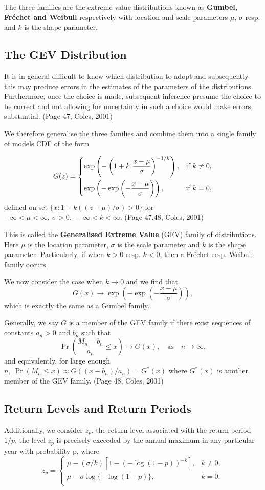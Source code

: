 \documentclass{article}
\begin{document}
The three families are the extreme value distributions known as \textbf{Gumbel, Fr\'{e}chet and Weibull} respectively with location and scale parameters $\mu$, $\sigma$ resp. and $k$ is the shape parameter.

\subsection{The GEV Distribution}
It is in general difficult to know which distribution to adopt and subsequently this may produce errors in the estimates of the parameters of the distributions. Furthermore, once the choice is made, subsequent inference presume the choice to be correct and not allowing for uncertainty in such a choice would make errors substantial. (Page 47, Coles, 2001)

We therefore generalise the three families and combine them into a single family of models CDF of the form

\begin{equation}
G(z)=
\begin{dcases}
\exp\left(-\left(1+k\ \frac{x-\mu}{\sigma}\right)^{-1/k}\right), & \text{if } k \neq 0,\\
\exp\left(-\exp\left(-\frac{x-\mu}{\sigma}\right)\right), & \text{if } k = 0,\label{maingev}
\end{dcases}
\end{equation}
defined on set $\{x:1+k((z-\mu)/\sigma) > 0\}$ for $-\infty < \mu < \infty,\ \sigma > 0,\  -\infty < k < \infty$. (Page 47,48, Coles, 2001)

This is called the \textbf{Generalised Extreme Value} (GEV) family of distributions. Here $\mu$ is the location parameter, $\sigma$ is the scale parameter and $k$ is the shape parameter. Particularly, if when $k>0$ resp. $k<0$, then a Fr\'echet resp. Weibull family occurs.

We now consider the case when $k \to 0$ and we find that 
$$G(x) \to \exp\left(-\exp\left(-\frac{x-\mu}{\sigma}\right)\right),$$ 
which is exactly the same as a Gumbel family.

Generally, we say $G$ is a member of the GEV family if there exist sequences of constants $a_n>0$ and $b_n$ such that 
$$\Pr\left(\frac{{M_n}-{b_n}}{a_n} \leqslant x\right) \to G(x), \quad \text{as} \quad n\to \infty,$$
and equivalently, for large enough $n, \ \Pr(M_n \leqslant x) \approx G((x-b_n)/a_n)=G^{*}(x)$ where $G^{*}(x)$ is another member of the GEV family. (Page 48, Coles, 2001)

\subsection{Return Levels and Return Periods}
Additionally, we consider $z_p$, the return level associated with the return period $1/p$, the level $z_p$ is precisely exceeded by the annual maximum in any particular year with probability p, where 
$$ z_p=
\begin{cases} 
\mu-(\sigma/k)[1-(-\log(1-p))^{-k}], & k\ne 0,\\
\mu -\sigma \log\{-\log(1-p)\},  &k=0.\\
\end{cases}
$$
\end{document}
